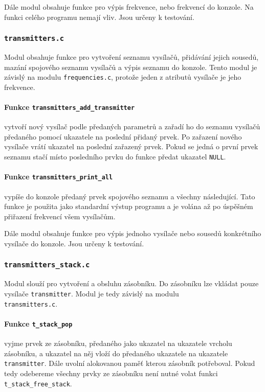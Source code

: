 \documentclass[12pt]{report}
\begin{document}
Dále modul obsahuje funkce pro výpis frekvence, nebo frekvencí do konzole. Na funkci celého programu nemají vliv. Jsou určeny k testování.

\subsubsection{\Large{\texttt{transmitters.c}}}
Modul obsahuje funkce pro vytvoření seznamu vysílačů, přidávání jejich sousedů, mazání spojového seznamu vysílačů a výpis seznamu do konzole. Tento modul je závislý na modulu \texttt{frequencies.c}, protože jeden z atributů vysílače je jeho frekvence.

\cprotect\paragraph{Funkce \verb|transmitters_add_transmitter|}
vytvoří nový vysílač podle předaných parametrů a zařadí ho do seznamu vysílačů předaného pomocí ukazatele na poslední přidaný prvek. Po zařazení nového vysílače vrátí ukazatel na poslední zařazený prvek. Pokud se jedná o první prvek seznamu stačí místo posledního prvku do funkce předat ukazatel \texttt{NULL}.

\cprotect\paragraph{Funkce \verb|transmitters_print_all|}
vypíše do konzole předaný prvek spojového seznamu a všechny následující. Tato funkce je použita jako standardní výstup programu a je volána až po úspěšném přiřazení frekvencí všem vysílačům.

Dále modul obsahuje funkce pro výpis jednoho vysílače nebo sousedů konkrétního vysílače do konzole. Jsou určeny k testování.
\pagebreak
\cprotect\subsubsection{\Large{\verb|transmitters_stack.c|}}
Modul slouží pro vytvoření a obsluhu zásobníku. Do zásobníku lze vkládat pouze vysílače \texttt{transmitter}. Modul je tedy závislý na modulu \\ \texttt{transmitters.c}.

\cprotect\paragraph{Funkce \verb|t_stack_pop|}
vyjme prvek ze zásobníku, předaného jako ukazatel na ukazatele vrcholu zásobníku, a ukazatel na něj vloží do předaného ukazatele na ukazatele \texttt{transmitter}. Dále uvolní alokovanou paměť kterou zásobník potřeboval. Pokud tedy odebereme všechny prvky ze zásobníku není nutné volat funkci \verb|t_stack_free_stack|.
\end{document}
